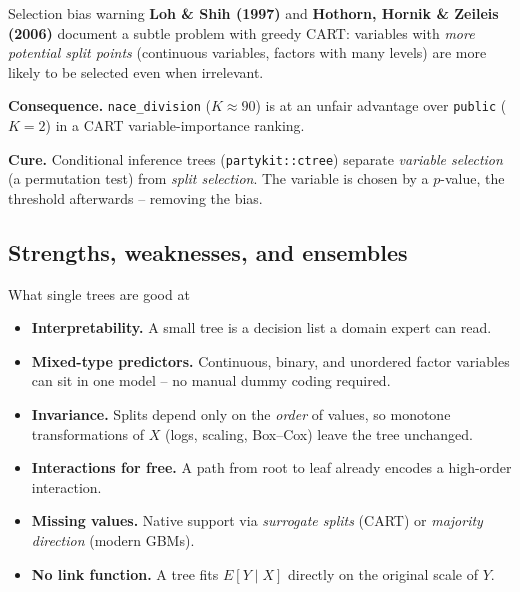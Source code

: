 \documentclass[10pt,ignorenonframetext,aspectratio=169]{beamer}
\begin{document}
\begin{frame}{Selection bias warning}
\textbf{Loh \& Shih (1997)} and \textbf{Hothorn, Hornik \& Zeileis (2006)} document a subtle problem with greedy CART: variables with \emph{more potential split points} (continuous variables, factors with many levels) are \alert{more likely to be selected} even when irrelevant.

\medskip
\textbf{Consequence.} \texttt{nace\_division} ($K \approx 90$) is at an unfair advantage over \texttt{public} ($K = 2$) in a CART variable-importance ranking.

\medskip
\textbf{Cure.} Conditional inference trees (\texttt{partykit::ctree}) separate \emph{variable selection} (a permutation test) from \emph{split selection}. The variable is chosen by a $p$-value, the threshold afterwards -- removing the bias.
\end{frame}


\subsection{Strengths, weaknesses, and ensembles}

\begin{frame}{What single trees are good at}
\begin{itemize}
    \justifying
    \item \textbf{Interpretability.} A small tree is a decision list a domain expert can read.
    \item \textbf{Mixed-type predictors.} Continuous, binary, and unordered factor variables can sit in one model -- no manual dummy coding required.
    \item \textbf{Invariance.} Splits depend only on the \emph{order} of values, so monotone transformations of $X$ (logs, scaling, Box--Cox) leave the tree unchanged.
    \item \textbf{Interactions for free.} A path from root to leaf already encodes a high-order interaction.
    \item \textbf{Missing values.} Native support via \emph{surrogate splits} (CART) or \emph{majority direction} (modern GBMs).
    \item \textbf{No link function.} A tree fits $E[Y \mid X]$ directly on the original scale of $Y$.
\end{itemize}
\end{frame}
\end{document}
